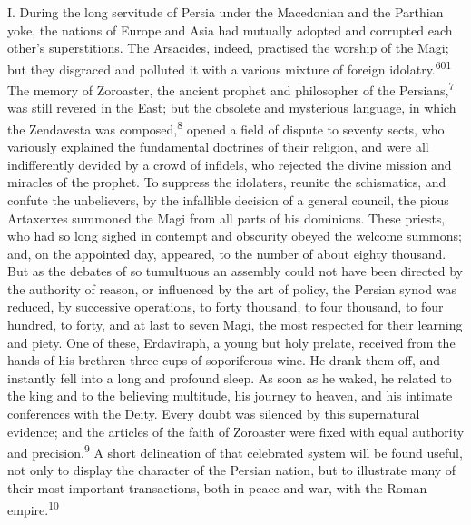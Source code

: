 





I. During the long servitude of Persia under the Macedonian and
the Parthian yoke, the nations of Europe and Asia had mutually
adopted and corrupted each other’s superstitions. The Arsacides,
indeed, practised the worship of the Magi; but they disgraced and
polluted it with a various mixture of foreign idolatry.\textsuperscript{601} The
memory of Zoroaster, the ancient prophet and philosopher of the
Persians,\textsuperscript{7} was still revered in the East; but the obsolete and
mysterious language, in which the Zendavesta was composed,\textsuperscript{8}
opened a field of dispute to seventy sects, who variously
explained the fundamental doctrines of their religion, and were
all indifferently devided by a crowd of infidels, who rejected
the divine mission and miracles of the prophet. To suppress the
idolaters, reunite the schismatics, and confute the unbelievers,
by the infallible decision of a general council, the pious
Artaxerxes summoned the Magi from all parts of his dominions.
These priests, who had so long sighed in contempt and obscurity
obeyed the welcome summons; and, on the appointed day, appeared,
to the number of about eighty thousand. But as the debates of so
tumultuous an assembly could not have been directed by the
authority of reason, or influenced by the art of policy, the
Persian synod was reduced, by successive operations, to forty
thousand, to four thousand, to four hundred, to forty, and at
last to seven Magi, the most respected for their learning and
piety. One of these, Erdaviraph, a young but holy prelate,
received from the hands of his brethren three cups of
soporiferous wine. He drank them off, and instantly fell into a
long and profound sleep. As soon as he waked, he related to the
king and to the believing multitude, his journey to heaven, and
his intimate conferences with the Deity. Every doubt was silenced
by this supernatural evidence; and the articles of the faith of
Zoroaster were fixed with equal authority and precision.\textsuperscript{9} A
short delineation of that celebrated system will be found useful,
not only to display the character of the Persian nation, but to
illustrate many of their most important transactions, both in
peace and war, with the Roman empire.\textsuperscript{10}

